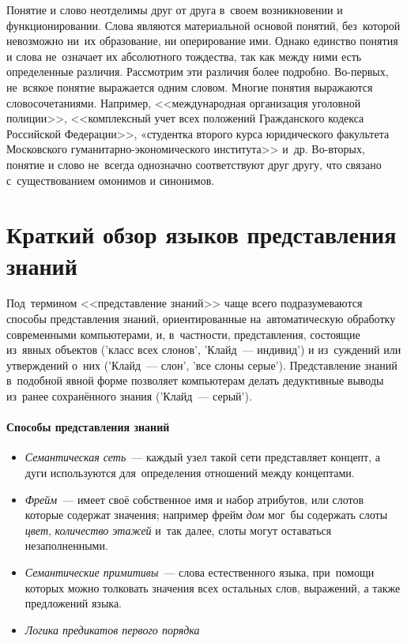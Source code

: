\documentclass[12pt]{article}
\theoremstyle{definition}
\theoremstyle{remark}
\numberwithin{equation}{section}
\begin{document}
Понятие и слово неотделимы друг от друга в~своем возникновении и
функционировании. Слова являются материальной основой понятий, без~которой
невозможно ни~их образование, ни оперирование ими. Однако единство
понятия и слова не~означает их абсолютного тождества, так как между
ними есть определенные различия. Рассмотрим эти различия более подробно.
Во-первых, не~всякое понятие выражается одним словом. Многие понятия
выражаются словосочетаниями. Например, <<международная организация
уголовной полиции>>, <<комплексный учет всех положений Гражданского
кодекса Российской Федерации>>, «студентка второго курса юридического
факультета Московского гуманитарно-экономического института>> и~др.
Во-вторых, понятие и слово не~всегда однозначно соответствуют друг другу,
что связано с~существованием омонимов и синонимов.

\section{Краткий обзор языков представления знаний}
Под~термином <<представление знаний>> чаще всего подразумеваются способы
представления знаний, ориентированные на~автоматическую обработку
современными компьютерами, и, в~частности, представления, состоящие
из~явных объектов ('класс всех слонов', 'Клайд~--- индивид') и из~суждений
или утверждений о~них ('Клайд~--- слон', 'все слоны серые'). Представление
знаний в~подобной явной форме позволяет компьютерам делать дедуктивные
выводы из~ранее сохранённого знания ('Клайд~--- серый').

\paragraph{Способы представления знаний}
\begin{itemize}
    \item \textsl{Семантическая сеть}~--- каждый узел такой сети
    представляет концепт, а дуги используются для~определения отношений
    между концептами.
    \item \textsl{Фрейм}~--- имеет своё собственное имя и набор
    атрибутов, или слотов которые содержат значения; например фрейм
    {\it дом} мог~бы содержать слоты {\it цвет}, {\it количество этажей}
    и~так далее, слоты могут оставаться незаполненными.
    \item \textsl{Семантические примитивы}~--- слова естественного
    языка, при~помощи которых можно толковать значения всех остальных
    слов, выражений, а также предложений языка.
    \item \textsl{Логика предикатов первого порядка}
\end{itemize}
\end{document}
